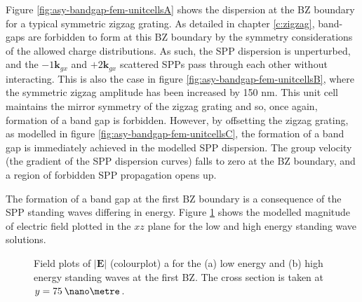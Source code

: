 Figure \ref{fig:asy-bandgap-fem-unitcellsA} shows the dispersion at the BZ boundary for a typical symmetric zigzag grating. As detailed in chapter \ref{c:zigzag}, band-gaps are forbidden to form at this BZ boundary by the symmetry considerations of the allowed charge distributions. As such, the SPP dispersion is unperturbed, and the  $-1\mathbf{k}_{gx}$ and $+2\mathbf{k}_{gx}$ scattered SPPs pass through each other without interacting. This is also the case in figure \ref{fig:asy-bandgap-fem-unitcellsB}, where the symmetric zigzag amplitude has been increased by 150 nm. This unit cell maintains the mirror symmetry of the zigzag grating and so, once again, formation of a band gap is forbidden. However, by offsetting the zigzag grating, as modelled in figure \ref{fig:asy-bandgap-fem-unitcellsC}, the formation of a band gap is immediately achieved in the modelled SPP dispersion. The group velocity (the gradient of the SPP dispersion curves) falls to zero at the BZ boundary, and a region of forbidden SPP propagation opens up.

The formation of a band gap at the first BZ boundary is a consequence of the SPP standing waves differing in energy. Figure \ref{fig:aszz-bandgaops-mage-xz} shows the modelled magnitude of electric field plotted in the $xz$ plane for the low and high energy standing wave solutions.

\begin{figure}
\begin{center}
\end{center}
\caption[Field plots of $|\mathbf{E}|$ (colourplot) a for the low energy and high energy standing waves at the first BZ.]{Field plots of $|\mathbf{E}|$ (colourplot) a for the (a) low energy and (b) high energy standing waves at the first BZ. The cross section is taken at $y=75 \:\nano\metre$. \label{fig:aszz-bandgaops-mage-xz}}
\end{figure}


